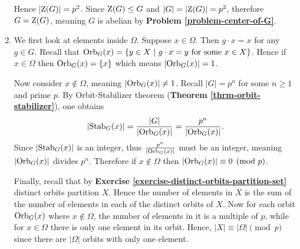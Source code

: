 \begin{enumerate}
    Hence $|\mathrm{Z}(G)| = p^2$. Since $\mathrm{Z}(G) \leq G$ and $|G| = |\mathrm{Z}(G)| = p^2$, therefore $G = \mathrm{Z}(G)$, meaning $G$ is abelian by \textbf{Problem \ref{problem-center-of-G}}.

    \item We first look at elements inside $\Omega$. Suppose $x \in \Omega$. Then $g \cdot x = x$ for any $g \in G$. Recall that $\mathrm{Orb}_{G}(x) = \{y \in X \ | \  g \cdot x = y \text{ for some } x \in X\}$. Hence if $x \in \Omega$ then $\mathrm{Orb}_{G}(x) = \{x\}$ which means $|\mathrm{Orb}_{G}(x)| = 1$.
    
    Now consider $x \notin \Omega$, meaning $|\mathrm{Orb}_{G}(x)| \neq 1$. Recall $|G| = p^n$ for some $n \geq 1$ and prime $p$. By Orbit-Stabilizer theorem (\textbf{Theorem \ref{thrm-orbit-stabilizer}}), one obtains
    \[
        |\mathrm{Stab}_{G}(x)| = \frac{|G|}{|\mathrm{Orb}_{G}(x)|} = \frac{p^n}{|\mathrm{Orb}_{G}(x)|}.
    \]
    Since $|\mathrm{Stab}_{G}(x)|$ is an integer, thus $\frac{p^n}{|\mathrm{Orb}_{G}(x)|}$ must be an integer, meaning $|\mathrm{Orb}_{G}(x)|$ divides $p^n$. Therefore if $x \notin \Omega$ then $|\mathrm{Orb}_{G}(x)| \equiv 0 \pmod p$.
    
    Finally, recall that by \textbf{Exercise \ref{exercise-distinct-orbits-partition-set}} distinct orbits partition $X$. Hence the number of elements in $X$ is the sum of the number of elements in each of the distinct orbits of $X$. Now for each orbit $\mathrm{Orb}_{G}(x)$ where $x \notin \Omega$, the number of elements in it is a multiple of $p$, while for $x \in \Omega$ there is only one element in its orbit. Hence, $|X| \equiv |\Omega| \pmod p$ since there are $|\Omega|$ orbits with only one element.
\end{enumerate}

